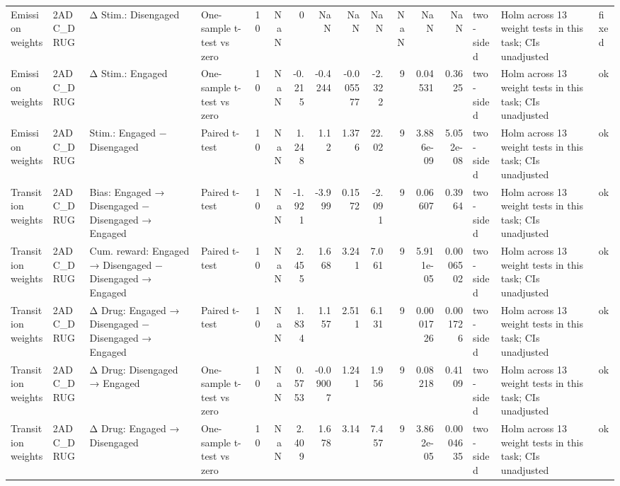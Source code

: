 \begin{tabular}{llllrrrrrrrrrlll}
Emission weights & 2ADC\_DRUG & Δ Stim.: Disengaged & One-sample t-test vs zero & 10 & NaN & 0 & NaN & NaN & NaN & NaN & NaN & NaN & two-sided & Holm across 13 weight tests in this task; CIs unadjusted & fixed \\
Emission weights & 2ADC\_DRUG & Δ Stim.: Engaged & One-sample t-test vs zero & 10 & NaN & -0.215 & -0.4244 & -0.005577 & -2.322 & 9 & 0.04531 & 0.3625 & two-sided & Holm across 13 weight tests in this task; CIs unadjusted & ok \\
Emission weights & 2ADC\_DRUG & Stim.: Engaged − Disengaged & Paired t-test & 10 & NaN & 1.248 & 1.12 & 1.376 & 22.02 & 9 & 3.886e-09 & 5.052e-08 & two-sided & Holm across 13 weight tests in this task; CIs unadjusted & ok \\
Transition weights & 2ADC\_DRUG & Bias: Engaged → Disengaged − Disengaged → Engaged & Paired t-test & 10 & NaN & -1.921 & -3.999 & 0.1572 & -2.091 & 9 & 0.06607 & 0.3964 & two-sided & Holm across 13 weight tests in this task; CIs unadjusted & ok \\
Transition weights & 2ADC\_DRUG & Cum. reward: Engaged → Disengaged − Disengaged → Engaged & Paired t-test & 10 & NaN & 2.455 & 1.668 & 3.241 & 7.061 & 9 & 5.911e-05 & 0.0006502 & two-sided & Holm across 13 weight tests in this task; CIs unadjusted & ok \\
Transition weights & 2ADC\_DRUG & Δ Drug: Engaged → Disengaged − Disengaged → Engaged & Paired t-test & 10 & NaN & 1.834 & 1.157 & 2.511 & 6.131 & 9 & 0.0001726 & 0.001726 & two-sided & Holm across 13 weight tests in this task; CIs unadjusted & ok \\
Transition weights & 2ADC\_DRUG & Δ Drug: Disengaged → Engaged & One-sample t-test vs zero & 10 & NaN & 0.5753 & -0.09007 & 1.241 & 1.956 & 9 & 0.08218 & 0.4109 & two-sided & Holm across 13 weight tests in this task; CIs unadjusted & ok \\
Transition weights & 2ADC\_DRUG & Δ Drug: Engaged → Disengaged & One-sample t-test vs zero & 10 & NaN & 2.409 & 1.678 & 3.14 & 7.457 & 9 & 3.862e-05 & 0.0004635 & two-sided & Holm across 13 weight tests in this task; CIs unadjusted & ok \\
\bottomrule
\end{tabular}
